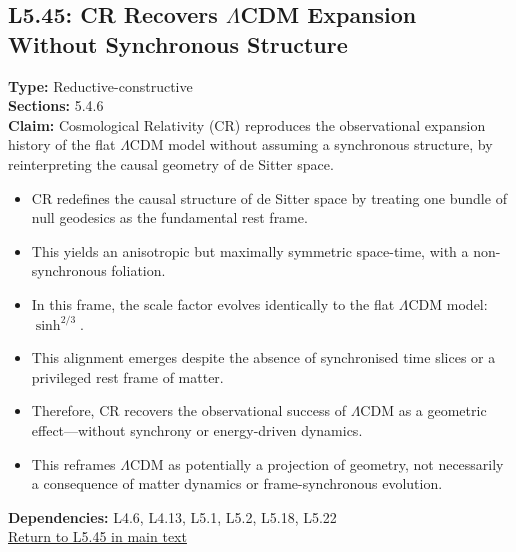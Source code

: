 \documentclass[12pt]{book}
\newcommand{\returnlink}[1]{\hyperref[logic:#1]{Return to #1 in main text}\xspace}
\begin{document}
\subsection*{L5.45: CR Recovers $\Lambda$CDM Expansion Without Synchronous Structure}
\label{appendix:L5.45}
\textbf{Type:} Reductive-constructive \\
\textbf{Sections:} 5.4.6 \\
\textbf{Claim:} Cosmological Relativity (CR) reproduces the observational expansion history of the flat $\Lambda$CDM model without assuming a synchronous structure, by reinterpreting the causal geometry of de Sitter space.
\begin{itemize}
  \item CR redefines the causal structure of de Sitter space by treating one bundle of null geodesics as the fundamental rest frame.
  \item This yields an anisotropic but maximally symmetric space-time, with a non-synchronous foliation.
  \item In this frame, the scale factor evolves identically to the flat $\Lambda$CDM model: $\sinh^{2/3}$.
  \item This alignment emerges despite the absence of synchronised time slices or a privileged rest frame of matter.
  \item Therefore, CR recovers the observational success of $\Lambda$CDM as a geometric effect---without synchrony or energy-driven dynamics.
  \item This reframes $\Lambda$CDM as potentially a projection of geometry, not necessarily a consequence of matter dynamics or frame-synchronous evolution.
\end{itemize}
\textbf{Dependencies:} L4.6, L4.13, L5.1, L5.2, L5.18, L5.22 \\
\returnlink{L5.45}
\end{document}
